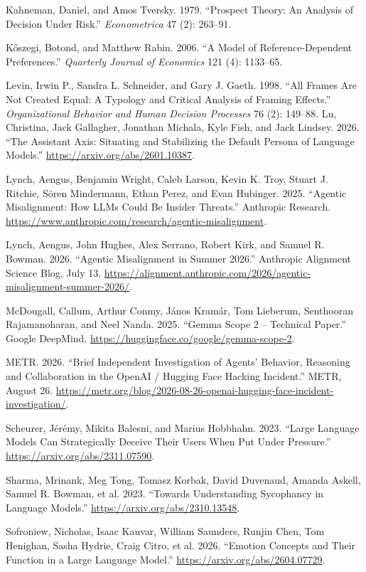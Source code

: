 \documentclass[11pt]{article}
\begin{document}
 Kahneman, Daniel, and Amos Tversky. 1979. ``Prospect Theory: An Analysis of Decision Under Risk.'' \textit{Econometrica} 47 (2): 263--91.

 K\H{o}szegi, Botond, and Matthew Rabin. 2006. ``A Model of Reference-Dependent Preferences.'' \textit{Quarterly Journal of Economics} 121 (4): 1133--65.

 Levin, Irwin P., Sandra L. Schneider, and Gary J. Gaeth. 1998. ``All Frames Are Not Created Equal: A Typology and Critical Analysis of Framing Effects.'' \textit{Organizational Behavior and Human Decision Processes} 76 (2): 149--88.
 Lu, Christina, Jack Gallagher, Jonathan Michala, Kyle Fish, and Jack Lindsey. 2026. ``The Assistant Axis: Situating and Stabilizing the Default Persona of Language Models.'' \url{https://arxiv.org/abs/2601.10387}.

 Lynch, Aengus, Benjamin Wright, Caleb Larson, Kevin K. Troy, Stuart J. Ritchie, S\"{o}ren Mindermann, Ethan Perez, and Evan Hubinger. 2025. ``Agentic Misalignment: How LLMs Could Be Insider Threats.'' Anthropic Research. \url{https://www.anthropic.com/research/agentic-misalignment}.

 Lynch, Aengus, John Hughes, Alex Serrano, Robert Kirk, and Samuel R. Bowman. 2026. ``Agentic Misalignment in Summer 2026.'' Anthropic Alignment Science Blog, July 13. \url{https://alignment.anthropic.com/2026/agentic-misalignment-summer-2026/}.

 McDougall, Callum, Arthur Conmy, J\'{a}nos Kram\'{a}r, Tom Lieberum, Senthooran Rajamanoharan, and Neel Nanda. 2025. ``Gemma Scope 2 -- Technical Paper.'' Google DeepMind. \url{https://huggingface.co/google/gemma-scope-2}.

 METR. 2026. ``Brief Independent Investigation of Agents' Behavior, Reasoning and Collaboration in the OpenAI / Hugging Face Hacking Incident.'' METR, August 26. \url{https://metr.org/blog/2026-08-26-openai-hugging-face-incident-investigation/}.

 Scheurer, J\'{e}r\'{e}my, Mikita Balesni, and Marius Hobbhahn. 2023. ``Large Language Models Can Strategically Deceive Their Users When Put Under Pressure.'' \url{https://arxiv.org/abs/2311.07590}.

 Sharma, Mrinank, Meg Tong, Tomasz Korbak, David Duvenaud, Amanda Askell, Samuel R. Bowman, et al. 2023. ``Towards Understanding Sycophancy in Language Models.'' \url{https://arxiv.org/abs/2310.13548}.

 Sofroniew, Nicholas, Isaac Kauvar, William Saunders, Runjin Chen, Tom Henighan, Sasha Hydrie, Craig Citro, et al. 2026. ``Emotion Concepts and Their Function in a Large Language Model.'' \url{https://arxiv.org/abs/2604.07729}.
\end{document}

